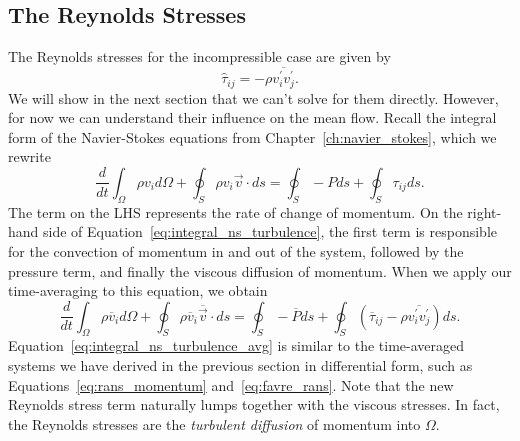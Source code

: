 \subsection{The Reynolds Stresses}
The Reynolds stresses for the incompressible case are given by 
\begin{equation}
	\hat \tau_{ij} = -\rho \overline{v_i^{\prime}v_j^{\prime}}.
\end{equation}
We will show in the next section that we can't solve for them directly. However, for now we can understand their influence on the mean flow. Recall the integral form of the Navier-Stokes equations from Chapter~\ref{ch:navier_stokes}, which we rewrite
\begin{equation}
	\frac{d}{dt}\int_\Omega \rho v_i d\Omega + \oint_S \rho v_i \vec{v} \cdot ds = \oint_S -P ds + \oint_S \tau_{ij} ds.
	\label{eq:integral_ns_turbulence}
\end{equation}
The term on the LHS represents the rate of change of momentum. On the right-hand side of Equation~\ref{eq:integral_ns_turbulence}, the first term is responsible for the convection of momentum in and out of the system, followed by the pressure term, and finally the viscous diffusion of momentum. When we apply our time-averaging to this equation, we obtain
\begin{equation}
	\frac{d}{dt}\int_\Omega \rho \overline v_i d\Omega + \oint_S \rho  \overline v_i  \overline{\vec{v}} \cdot ds = \oint_S - \overline P ds + \oint_S  \left(\overline\tau_{ij}-\rho \overline{v_i^{\prime}v_j^{\prime}}\right)ds.
	\label{eq:integral_ns_turbulence_avg}
\end{equation}
Equation~\ref{eq:integral_ns_turbulence_avg} is similar to the time-averaged systems we have derived in the previous section in differential form, such as Equations~\ref{eq:rans_momentum} and~\ref{eq:favre_rans}. Note that the new Reynolds stress term naturally lumps together with the viscous stresses. In fact, the Reynolds stresses are the \textit{turbulent diffusion} of momentum into $\Omega$.

